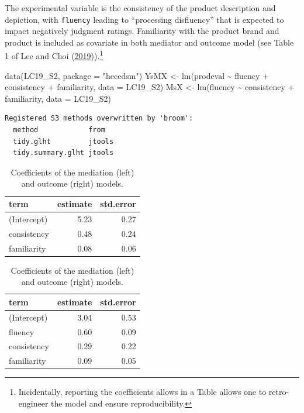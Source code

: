 \documentclass[
  11pt,
  letterpaper,
]{scrbook}
\newenvironment{Shaded}{\begin{snugshade}}{\end{snugshade}}
\newcommand{\AttributeTok}[1]{\textcolor[rgb]{0.40,0.45,0.13}{#1}}
\newcommand{\FunctionTok}[1]{\textcolor[rgb]{0.28,0.35,0.67}{#1}}
\newcommand{\NormalTok}[1]{\textcolor[rgb]{0.00,0.23,0.31}{#1}}
\newcommand{\OtherTok}[1]{\textcolor[rgb]{0.00,0.23,0.31}{#1}}
\newcommand{\SpecialCharTok}[1]{\textcolor[rgb]{0.37,0.37,0.37}{#1}}
\newcommand{\StringTok}[1]{\textcolor[rgb]{0.13,0.47,0.30}{#1}}
\theoremstyle{definition}
\theoremstyle{remark}
\begin{document}
The experimental variable is the consistency of the product description
and depiction, with \texttt{fluency} leading to ``processing
disfluency'' that is expected to impact negatively judgment ratings.
Familiarity with the product brand and product is included as covariate
in both mediator and outcome model (see Table 1 of Lee and Choi
(\protect\hyperlink{ref-Lee.Choi:2019}{2019})).\footnote{Incidentally,
  reporting the coefficients allows in a Table allows one to
  retro-engineer the model and ensure reproducibility.}

\begin{Shaded}
\begin{Highlighting}[]
\FunctionTok{data}\NormalTok{(LC19\_S2, }\AttributeTok{package =} \StringTok{"hecedsm"}\NormalTok{)}
\NormalTok{YsMX }\OtherTok{\textless{}{-}} \FunctionTok{lm}\NormalTok{(prodeval }\SpecialCharTok{\textasciitilde{}}\NormalTok{ fluency }\SpecialCharTok{+}\NormalTok{ consistency }\SpecialCharTok{+}\NormalTok{ familiarity,}
           \AttributeTok{data =}\NormalTok{ LC19\_S2)}
\NormalTok{MsX }\OtherTok{\textless{}{-}} \FunctionTok{lm}\NormalTok{(fluency }\SpecialCharTok{\textasciitilde{}}\NormalTok{ consistency }\SpecialCharTok{+}\NormalTok{ familiarity,}
           \AttributeTok{data =}\NormalTok{ LC19\_S2)}
\end{Highlighting}
\end{Shaded}

\begin{verbatim}
Registered S3 methods overwritten by 'broom':
  method            from  
  tidy.glht         jtools
  tidy.summary.glht jtools
\end{verbatim}

\hypertarget{tbl-coefsmediation}{}
\begin{table}
\caption{\label{tbl-coefsmediation}Coefficients of the mediation (left) and outcome (right) models. }\tabularnewline


\begin{tabular}{lrr}
\toprule
term & estimate & std.error\\
\midrule
(Intercept) & 5.23 & 0.27\\
consistency & 0.48 & 0.24\\
familiarity & 0.08 & 0.06\\
\bottomrule
\end{tabular}
\begin{tabular}{lrr}
\toprule
term & estimate & std.error\\
\midrule
(Intercept) & 3.04 & 0.53\\
fluency & 0.60 & 0.09\\
consistency & 0.29 & 0.22\\
familiarity & 0.09 & 0.05\\
\bottomrule
\end{tabular}
\end{table}
\end{document}
